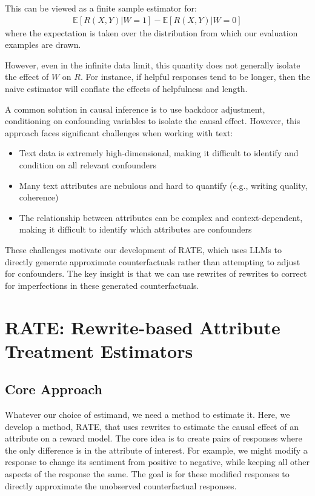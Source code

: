 \documentclass{article}
\theoremstyle{definition}
\newcommand{\EE}{\mathbb{E}}
\begin{document}
This can be viewed as a finite sample estimator for:
\begin{align*}
    \EE[R(X, Y)|W=1] - \EE[R(X, Y)|W=0]
\end{align*}
where the expectation is taken over the distribution from which our evaluation examples are drawn. 

However, even in the infinite data limit, this quantity does not generally isolate the effect of $W$ on $R$. For instance, if helpful responses tend to be longer, then the naive estimator will conflate the effects of helpfulness and length.

A common solution in causal inference is to use backdoor adjustment, conditioning on confounding variables to isolate the causal effect. However, this approach faces significant challenges when working with text:

\begin{itemize}
    \item Text data is extremely high-dimensional, making it difficult to identify and condition on all relevant confounders
    \item Many text attributes are nebulous and hard to quantify (e.g., writing quality, coherence)
    \item The relationship between attributes can be complex and context-dependent, making it difficult to identify which attributes are confounders
\end{itemize}

These challenges motivate our development of RATE, which uses LLMs to directly generate approximate counterfactuals rather than attempting to adjust for confounders. The key insight is that we can use rewrites of rewrites to correct for imperfections in these generated counterfactuals.

\section{RATE: Rewrite-based Attribute Treatment Estimators}

\subsection{Core Approach}
Whatever our choice of estimand, we need a method to estimate it. Here, we develop a method, RATE, that uses rewrites to estimate the causal effect of an attribute on a reward model. The core idea is to create pairs of responses where the only difference is in the attribute of interest. For example, we might modify a response to change its sentiment from positive to negative, while keeping all other aspects of the response the same. The goal is for these modified responses to directly approximate the unobserved counterfactual responses.
\end{document}

